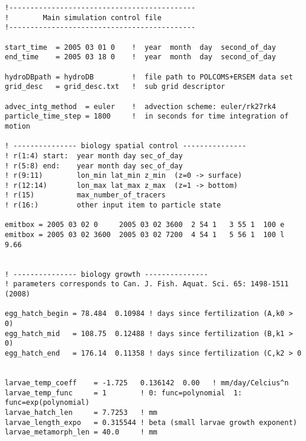 {\small 
\begin{verbatim}
!--------------------------------------------
!        Main simulation control file 
!--------------------------------------------

start_time  = 2005 03 01 0    !  year  month  day  second_of_day
end_time    = 2005 03 18 0    !  year  month  day  second_of_day

hydroDBpath = hydroDB         !  file path to POLCOMS+ERSEM data set
grid_desc   = grid_desc.txt   !  sub grid descriptor

advec_intg_method  = euler    !  advection scheme: euler/rk27rk4
particle_time_step = 1800     !  in seconds for time integration of motion

! --------------- biology spatial control ---------------
! r(1:4) start:  year month day sec_of_day
! r(5:8) end:    year month day sec_of_day
! r(9:11)        lon_min lat_min z_min  (z=0 -> surface)
! r(12:14)       lon_max lat_max z_max  (z=1 -> bottom)
! r(15)          max_number_of_tracers
! r(16:)         other input item to particle state

emitbox = 2005 03 02 0     2005 03 02 3600  2 54 1   3 55 1  100 e 
emitbox = 2005 03 02 3600  2005 03 02 7200  4 54 1   5 56 1  100 l 9.66


! --------------- biology growth ---------------
! parameters corresponds to Can. J. Fish. Aquat. Sci. 65: 1498-1511 (2008)

egg_hatch_begin = 78.484  0.10984 ! days since fertilization (A,k0 > 0)
egg_hatch_mid   = 108.75  0.12488 ! days since fertilization (B,k1 > 0)
egg_hatch_end   = 176.14  0.11358 ! days since fertilization (C,k2 > 0


larvae_temp_coeff    = -1.725   0.136142  0.00   ! mm/day/Celcius^n 
larvae_temp_func     = 1        ! 0: func=polynomial  1: func=exp(polynomial)
larvae_hatch_len     = 7.7253   ! mm
larvae_length_expo   = 0.315544 ! beta (small larvae growth exponent) 
larvae_metamorph_len = 40.0     ! mm
\end{verbatim}
}


